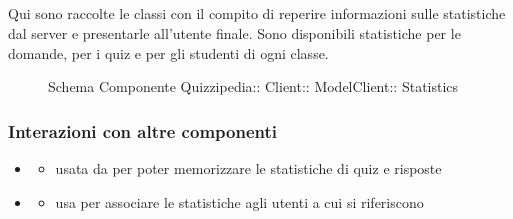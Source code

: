 \subsection{}
Qui sono raccolte le classi con il compito di reperire informazioni sulle statistiche dal server e presentarle all'utente finale. Sono disponibili statistiche per le domande, per i quiz e per gli studenti di ogni classe.
\begin{figure}[H]
\centering
\noindent{}
\caption[Schema Componente Statistics]{Schema Componente Quizzipedia:: Client:: ModelClient:: Statistics}
\end{figure}
\subsubsection{Interazioni con altre componenti}
\begin{itemize}
\item {}
\begin{itemize}
\item usata da  per poter memorizzare le statistiche di quiz e risposte
\end{itemize}
\item {}
\begin{itemize}
\item usa  per associare le statistiche agli utenti a cui si riferiscono
\end{itemize}
\end{itemize}
